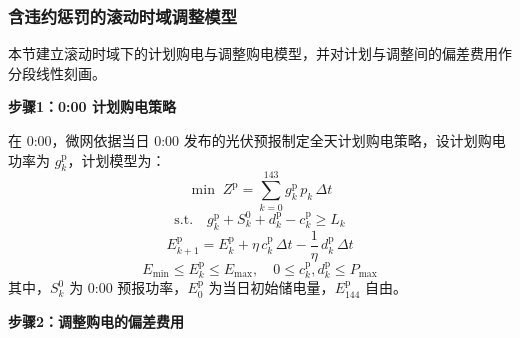 
\subsubsection{含违约惩罚的滚动时域调整模型}

本节建立滚动时域下的计划购电与调整购电模型，并对计划与调整间的偏差费用作分段线性刻画。

\textbf{步骤1：0:00 计划购电策略}

在 0:00，微网依据当日 0:00 发布的光伏预报制定全天计划购电策略，设计划购电功率为 $g^{\mathrm{p}}_k$，计划模型为：
\begin{equation}
    \min \; Z^{\mathrm{p}}=\sum_{k=0}^{143} g^{\mathrm{p}}_k\,p_k\,\Delta t
\end{equation}
\begin{equation}
    \mathrm{s.t.}\quad g^{\mathrm{p}}_k+S^{0}_k+d^{\mathrm{p}}_k-c^{\mathrm{p}}_k\geq L_k
\end{equation}
\begin{equation}
    E^{\mathrm{p}}_{k+1}=E^{\mathrm{p}}_k+\eta\,c^{\mathrm{p}}_k\,\Delta t-\frac{1}{\eta}\,d^{\mathrm{p}}_k\,\Delta t
\end{equation}
\begin{equation}
    E_{\min}\leq E^{\mathrm{p}}_k\leq E_{\max},\quad 0\leq c^{\mathrm{p}}_k,d^{\mathrm{p}}_k\leq P_{\max}
\end{equation}
其中，$S^{0}_k$ 为 0:00 预报功率，$E^{\mathrm{p}}_0$ 为当日初始储电量，$E^{\mathrm{p}}_{144}$ 自由。

\textbf{步骤2：调整购电的偏差费用}

